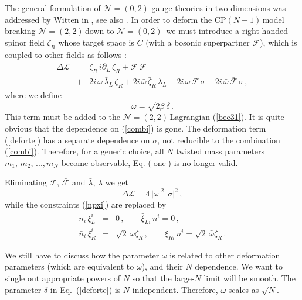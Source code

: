\documentclass[epsfig,12pt]{article}
\def\beq{\begin{equation}}
\def\eeq{\end{equation}}
\def\beqn{\begin{eqnarray}}
\def\eeqn{\end{eqnarray}}
\newcommand{\ntt}{${\mathcal N}=(2,2)\,$}
\newcommand{\nzt}{${\mathcal N}=(0,2)\,$}
\newcommand{\cpn}{CP$(N-1)\,$}
\newcommand{\cell}{{\mathcal L}}
\newcommand{\pt}{\partial}
\newcommand{\cf}{${\mathcal F}$}
\newcommand{\cfe}{{\mathcal F}}
\def\beqn{\begin{eqnarray}}
\def\eeqn{\end{eqnarray}}
\def\beq{\begin{equation}}
\def\eeq{\end{equation}}
\newcommand{\ntwoo}{${\mathcal N}= \left(0,2\right) $ }
\begin{document}
The general formulation of \ntwoo gauge theories in two dimensions was addressed by Witten in 
\cite{W93}, see also \cite{Witten:2005px}.
In order to deform the \cpn model breaking \ntt down to \mbox{\nzt}
we must introduce a right-handed spinor field $\zeta_R$ whose  target space is $C$ 
(with a bosonic superpartner \cf), which is coupled to other fields as follows
\cite{EdTo,SY1}:
\beqn
\Delta\cell 
&=&
\bar\zeta_R\, i\pt_L\, \zeta_R   +\bar\cfe\,\cfe
	\nonumber\\[2mm]
&+&
 2i\, \omega \, \bar\lambda_L\, \zeta_R +  2i\, \bar{\omega} \, \bar\zeta_R\, \lambda_L -
	 2i\, \omega \, \cfe\, \sigma -
 2i\, \bar{\omega} \, \bar\cfe\, \bar{\sigma}\,,
 \label{deforte}
\eeqn
where we define
\beq
\omega = \sqrt{2\beta}\,\delta\,.
\label{deffp}
\eeq
This term must be added to the \ntt Lagrangian (\ref{bee31}). 
It is quite obvious that the dependence on (\ref{combi}) is gone. 
The deformation term (\ref{deforte}) has a separate dependence on $\sigma$, not reducible to the
combination (\ref{combi}). Therefore, for a generic choice, all $N$ twisted mass
parameters $m_1,\,m_2,\, ..., m_N$ become observable, Eq. (\ref{one}) is no longer valid.

\vspace{1mm}

Eliminating \cf, $\bar\cfe$  and $\bar\lambda ,\,\lambda$ we get
\beq
\Delta\cell = 4\, |\omega |^2\,|\sigma |^2\,,
\label{deffpp}
\eeq
while the constraints (\ref{npxi}) are replaced by
\beqn
%
\bar{n}_i\,\xi^i_L
&= &
0\,,\qquad \bar\xi_{Li}\,n^i = 0\,,
\nonumber\\[2mm]
%
\bar{n}_i\,\xi^i_R &= & \sqrt{2}\,\omega\zeta_R\,,\qquad 
\bar\xi_{Ri}\,n^i =  \sqrt{2}\,\bar\omega\bar\zeta_R\,.
\label{npxip}
\eeqn

We still have to discuss how the parameter $\omega$ is related to other
deformation parameters (which are equivalent to $\omega$), and their $N$ dependence.
We want to single out appropriate powers of $N$ so that the large-$N$ limit will be smooth.
The parameter $\delta$ in Eq.~(\ref{deforte}) is $N$-independent. Therefore, $\omega$ scales as
$\sqrt N$.
\end{document}
